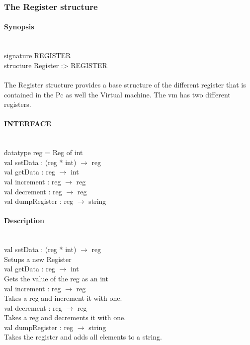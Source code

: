 \documentclass{article}
\begin{document}
\subsubsection{The Register structure}
\paragraph{Synopsis} \
\\
signature REGISTER\\
structure Register :> REGISTER\\
\\
The Register structure provides a base structure of the different register that
is contained in the Pc as well the Virtual machine. The vm has two different registers.\\
\paragraph{INTERFACE} \
\\
	datatype reg = Reg of int 
\\	
	val setData : (reg * int) $\rightarrow$ reg 				
\\	val getData : reg $\rightarrow$ int						
\\	val increment : reg $\rightarrow$ reg						
\\	val decrement : reg $\rightarrow$ reg						
\\	val dumpRegister : reg $\rightarrow$ string
\paragraph{Description} \ 
\\

	val setData : (reg * int) $\rightarrow$ reg\\
		Setups a new Register \\
	val getData : reg $\rightarrow$ int	\\
		Gets the value of the reg as an int\\					
	val increment : reg $\rightarrow$ reg\\		
		Takes a reg and increment it with one.\\	
	val decrement : reg $\rightarrow$ reg\\					
		Takes a reg and decrements it with one.\\
	val dumpRegister : reg $\rightarrow$ string\\
		Takes the register and adds all elements to a string.\\
\end{document}
